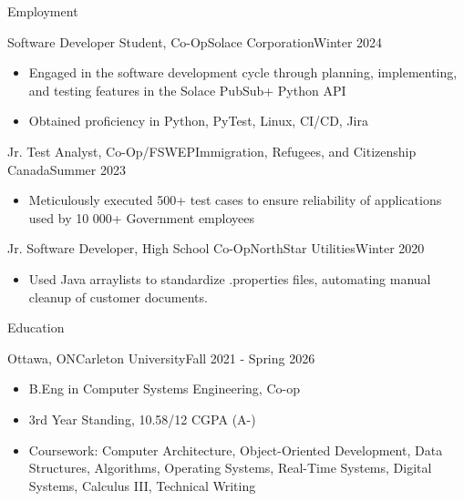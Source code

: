 \documentclass[]{mcdowellcv}
\begin{document}
	\begin{cvsection}{Employment}
		
	\begin{cvsubsection}{Software Developer Student, Co-Op}{Solace Corporation}{Winter 2024}			
		\begin{itemize}
			\item Engaged in the software development cycle through planning, implementing, and testing features in the Solace PubSub+ Python API
			\item Obtained proficiency in Python, PyTest, Linux, CI/CD, Jira

		\end{itemize}
	\end{cvsubsection}

		\begin{cvsubsection}{Jr. Test Analyst, Co-Op/FSWEP}{Immigration, Refugees, and Citizenship Canada}{Summer 2023}			
			\begin{itemize}
				\item Meticulously executed 500+ test cases to ensure reliability of applications used by 10 000+ Government employees
			\end{itemize}
		\end{cvsubsection}
		
			\begin{cvsubsection}{Jr. Software Developer, High School Co-Op}{NorthStar Utilities}{Winter 2020}	
			\begin{itemize}
				\item Used Java arraylists to standardize .properties files, automating manual cleanup of customer documents.
			\end{itemize}
		\end{cvsubsection}
	\end{cvsection}

	\begin{cvsection}{Education}
		\begin{cvsubsection}{Ottawa, ON}{Carleton University}{Fall 2021 - Spring 2026}
			\begin{itemize}
				\item B.Eng in Computer Systems Engineering, Co-op
				\item 3rd Year Standing, 10.58/12 CGPA (A-)
				\item Coursework: Computer Architecture, Object-Oriented Development, Data Structures, Algorithms, Operating Systems, Real-Time Systems, Digital Systems, Calculus III, Technical Writing
			\end{itemize}
		\end{cvsubsection}
	\end{cvsection}
	
\end{document}
